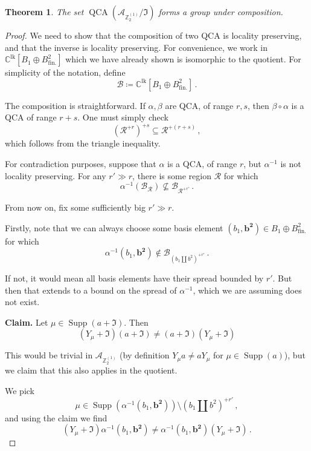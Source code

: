 \documentclass[aps,twocolumn,prx,floatfix,preprintnumbers, nofootinbib,10pt]{revtex4-2}
\numberwithin{equation}{section}
\newtheorem{theorem}{Theorem}[section]
\theoremstyle{definition}
\theoremstyle{remark}
\theoremstyle{claim}
\newcommand{\be}{\begin{equation}}
\newcommand{\ee}{\end{equation}}
\newcommand{\Z}{{\mathbb Z}}
\newcommand{\mc}[1]{\mathcal{#1}}
\newcommand{\paren}[1]{\left( #1 \right)}
\begin{document}
\begin{theorem}\label{thm:group_of_qca}
 The set $\operatorname{QCA}(\mc{A}_{\Z_2^{(1)}} / \mathfrak{I})$ forms a group under composition.
\end{theorem}

\begin{proof}
 We need to show that the composition of two QCA is locality preserving, and that the inverse is locality preserving. For convenience, we work in $\mathbb{C}^\text{lk}[B_1 \oplus B^2_\text{fin.}]$ which we have already shown is isomorphic to the quotient. For simplicity of the notation, define
 \be
 \mc{B} \coloneqq \mathbb{C}^\text{lk}[B_1 \oplus B^2_\text{fin.}] \,.
 \ee

 The composition is straightforward. If $\alpha, \beta$ are QCA, of range $r, s$, then $\beta \circ \alpha$ is a QCA of range $r + s$. One must simply check
 \be
 \paren{\mc{R}^{+r}}^{+s} \subseteq \mc{R}^{+(r + s)} \,,
 \ee
 which follows from the triangle inequality.

 For contradiction purposes, suppose that $\alpha$ is a QCA, of range $r$, but $\alpha^{-1}$ is not locality preserving. For any $r' \gg r$, there is some region $\mc{R}$ for which
 \be
 \alpha^{-1}\paren{\mc{B}_\mc{R}} \not\subseteq \mc{B}_{\mc{R}^{+r'}} \,.
 \ee

 From now on, fix some sufficiently big $r' \gg r$.

 Firstly, note that we can always choose some basis element $(b_1, \bm{b^2}) \in B_1 \oplus B^2_\text{fin.}$ for which
 \be
 \alpha^{-1}(b_1, \bm{b^2}) \notin \mc{B}_{\paren{b_1 \coprod b^2}^{+r'}} \,.
 \ee

 If not, it would mean all basis elements have their spread bounded by $r'$. But then that extends to a bound on the spread of $\alpha^{-1}$, which we are assuming does not exist.

 \textbf{Claim.} Let $\mu \in \operatorname{Supp}(a + \mathfrak{I})$. Then
 \be
 (Y_\mu + \mathfrak{I}) (a + \mathfrak{I}) \neq (a + \mathfrak{I}) (Y_\mu + \mathfrak{I})
 \ee

 This would be trivial in $\mc{A}_{\Z_2^{(1)}}$ (by definition $Y_\mu a \neq a Y_\mu$ for $\mu \in \operatorname{Supp}(a)$), but we claim that this also applies in the quotient.

 We pick
 \be
 \mu \in \operatorname{Supp}(\alpha^{-1}(b_1, \bm{b^2})) \setminus \paren{b_1 \coprod b^2}^{+r'} \,,
 \ee
 and using the claim we find
 \be
 (Y_\mu + \mathfrak{I}) \alpha^{-1}(b_1, \bm{b^2}) \neq \alpha^{-1}(b_1, \bm{b^2}) (Y_\mu + \mathfrak{I}) \,.
 \ee


\end{proof}
\end{document}
